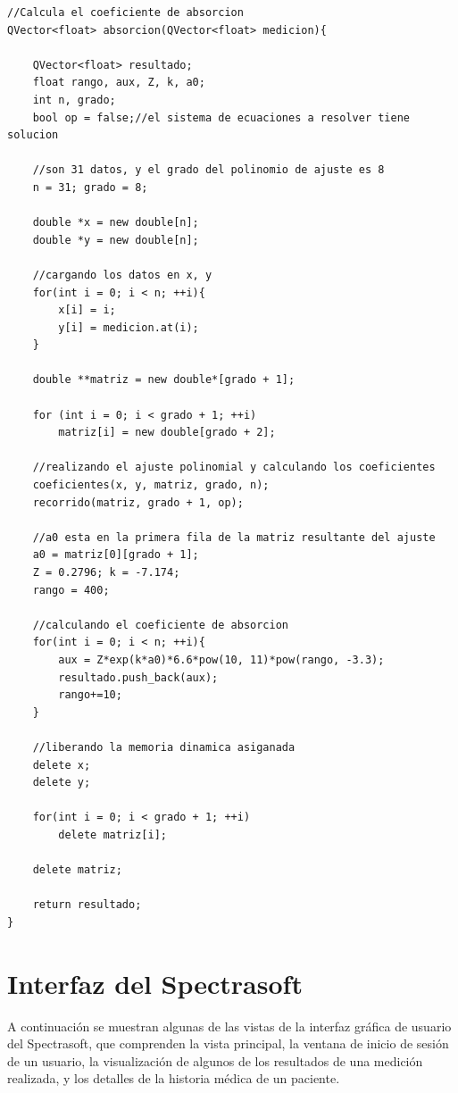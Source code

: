\begin{itemize}
			\begin{lstlisting}
//Calcula el coeficiente de absorcion
QVector<float> absorcion(QVector<float> medicion){

    QVector<float> resultado;
    float rango, aux, Z, k, a0;
    int n, grado;
    bool op = false;//el sistema de ecuaciones a resolver tiene solucion
    
    //son 31 datos, y el grado del polinomio de ajuste es 8
    n = 31; grado = 8;

    double *x = new double[n];
    double *y = new double[n];

    //cargando los datos en x, y
    for(int i = 0; i < n; ++i){
        x[i] = i;
        y[i] = medicion.at(i);
    }

    double **matriz = new double*[grado + 1];

    for (int i = 0; i < grado + 1; ++i)
        matriz[i] = new double[grado + 2];

    //realizando el ajuste polinomial y calculando los coeficientes
    coeficientes(x, y, matriz, grado, n);
    recorrido(matriz, grado + 1, op);

    //a0 esta en la primera fila de la matriz resultante del ajuste
    a0 = matriz[0][grado + 1];
    Z = 0.2796; k = -7.174;
    rango = 400;

    //calculando el coeficiente de absorcion
    for(int i = 0; i < n; ++i){
        aux = Z*exp(k*a0)*6.6*pow(10, 11)*pow(rango, -3.3);
        resultado.push_back(aux);
        rango+=10;
    }

    //liberando la memoria dinamica asiganada
    delete x;
    delete y;

    for(int i = 0; i < grado + 1; ++i)
        delete matriz[i];

    delete matriz;

    return resultado;
}
			\end{lstlisting}

	\end{itemize}

\newpage

\section{Interfaz del Spectrasoft}

	A continuaci\'{o}n se muestran algunas de las vistas de la interfaz gr\'{a}fica de usuario del Spectrasoft, que comprenden la vista principal, la ventana de inicio de sesi\'{o}n de un usuario, la visualizaci\'{o}n de algunos de los resultados de una medici\'{o}n realizada, y los detalles de la historia m\'{e}dica de un paciente.

